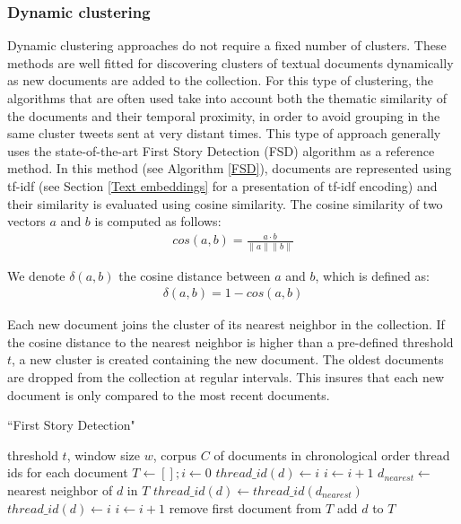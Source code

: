 	\subsubsection{Dynamic clustering \label{Subsubsec: incremental clustering}} Dynamic clustering approaches do not require a fixed number of clusters. These methods are well fitted for discovering clusters of textual documents dynamically as new documents are added to the collection. For this type of clustering, the algorithms that are often used take into account both the thematic similarity of the documents and their temporal proximity, in order to avoid grouping in the same cluster tweets sent at very distant times. This type of approach generally uses the state-of-the-art First Story Detection (FSD) \citep{allan_introduction_2002} algorithm as a reference method. In this method (see Algorithm \ref{FSD}), documents are represented using tf-idf (see Section \ref{Text embeddings} for a presentation of tf-idf encoding) and their similarity is evaluated using cosine similarity. The cosine similarity of two vectors $a$ and $b$  is computed as follows:
	\begin{align}
    cos(a, b) = \frac{a \cdot b}{\| a\|\| b\|}
	\end{align}
	
	We denote $\delta(a,b)$ the cosine distance between $a$ and $b$, which is defined as:
	\begin{align}
	    \delta(a,b) = 1 - cos(a, b)
	\end{align}
	
	Each new document joins the cluster of its nearest neighbor in the collection. If the cosine distance to the nearest neighbor is higher than a pre-defined threshold $t$, a new cluster is created containing the new document. The oldest documents are dropped from the collection at regular intervals. This insures that each new document is only compared to the most recent documents. 

\begin{algorithm}
\caption{``First Story Detection"}
\label{FSD}
\begin{algorithmic}[1]
\REQUIRE threshold $t$, window size $w$, corpus $C$ of documents in chronological order
\ENSURE thread ids for each document
\STATE $T \leftarrow \left[ \right] ; i \leftarrow 0 $
\STATE $thread\_id(d) \leftarrow i$
\STATE $i \leftarrow i+1$
\ELSE
\STATE $d_{nearest} \leftarrow $ nearest neighbor of $d$ in $T$
\STATE $thread\_id(d) \leftarrow thread\_id(d_{nearest})$
\ELSE
\STATE $thread\_id(d) \leftarrow i$
\STATE $i \leftarrow i+1$
\ENDIF
\ENDIF
{}
\STATE remove first document from $T$
\ENDIF
\STATE add $d$ to $T$
\ENDWHILE
\end{algorithmic}
\end{algorithm}



